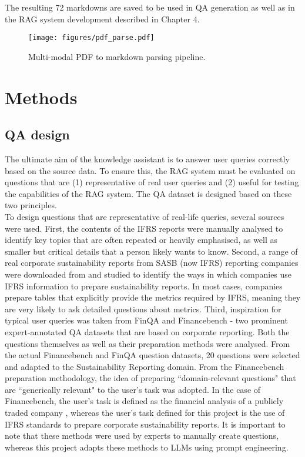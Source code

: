 The resulting 72 markdowns are saved to be used in QA generation as well as in the RAG system development described in Chapter 4.


\begin{figure}[H]
    \centering
    \texttt{[image: figures/pdf\_parse.pdf]}
    \caption{Multi-modal PDF to markdown parsing pipeline.}
    \label{fig:pdf_parse}
\end{figure}




\newpage
\section{Methods}



\subsection{QA design}\label{qa_design}

The ultimate aim of the knowledge assistant is to answer user queries correctly based on the source data. To ensure this, the RAG system must be evaluated on questions that are (1) representative of real user queries and (2) useful for testing the capabilities of the RAG system. The QA dataset is designed based on these two principles.\\

To design questions that are representative of real-life queries, several sources were used. First, the contents of the IFRS reports were manually analysed to identify key topics that are often repeated or heavily emphasised, as well as smaller but critical details that a person likely wants to know. Second, a range of real corporate sustainability reports from SASB (now IFRS) reporting companies were downloaded from \cite{sasb_reports} and studied to identify the ways in which companies use IFRS information to prepare sustainability reports. In most cases, companies prepare tables that explicitly provide the metrics required by IFRS, meaning they are very likely to ask detailed questions about metrics. Third, inspiration for typical user queries was taken from FinQA \cite{chen2022finqa} and Financebench \cite{islam2023financebench} - two prominent expert-annotated QA datasets that are based on corporate reporting. Both the questions themselves as well as their preparation methods were analysed. From the actual Financebench and FinQA question datasets, 20 questions were selected and adapted to the Sustainability Reporting domain. From the Financebench preparation methodology, the idea of preparing ``domain-relevant questions" that are ``generically relevant" to the user's task was adopted. In the case of Financebench, the user's task is defined as the financial analysis of a publicly traded company \cite{islam2023financebench}, whereas the user's task defined for this project is the use of IFRS standards to prepare corporate sustainability reports. It is important to note that these methods were used by experts to manually create questions, whereas this project adapts these methods to LLMs using prompt engineering. \\

